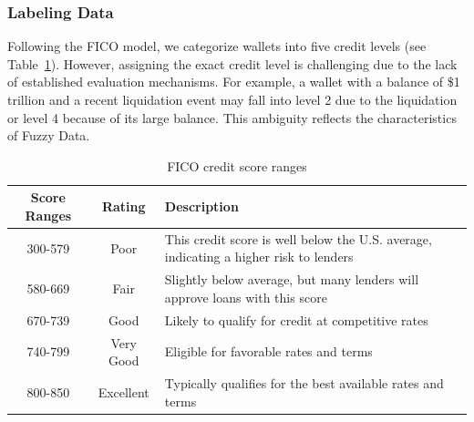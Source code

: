 \documentclass[runningheads]{llncs}
\begin{document}
{\begin{table}[h!]
\label{tab:example}
\end{table}

\subsubsection{Labeling Data}
Following the FICO model, we categorize wallets into five credit levels (see Table~\ref{tab:credit_score_ranges}). However, assigning the exact credit level is challenging due to the lack of established evaluation mechanisms. %
For example, a wallet with a balance of \$1 trillion and a recent liquidation event may fall into level 2 due to the liquidation or level 4 because of its large balance. This ambiguity reflects the characteristics of Fuzzy Data.

\begin{table}[h!]
\caption{FICO credit score ranges}
\label{tab:credit_score_ranges}
\centering
\begin{tabularx}{\textwidth}{|c|c|X|}
\hline
\textbf{Score Ranges} & \textbf{Rating} & \textbf{Description} \\ 
\hline
300-579 & Poor & This credit score is well below the U.S. average, indicating a higher risk to lenders \\ 
\hline
580-669 & Fair & Slightly below average, but many lenders will approve loans with this score \\ 
\hline
670-739 & Good & Likely to qualify for credit at competitive rates \\ 
\hline
740-799 & Very Good & Eligible for favorable rates and terms \\ 
\hline
800-850 & Excellent & Typically qualifies for the best available rates and terms \\ 
\hline 
\end{tabularx}
\end{table}

}
\end{document}
